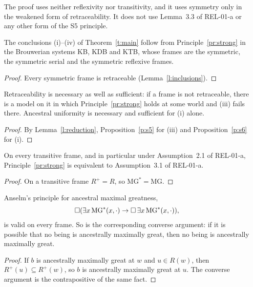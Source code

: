 \documentclass{situationist-preprint}
\newcommand{\MG}{\mathrm{MG}}
\newcommand{\MGs}{\mathrm{MG}^{*}}
\newcommand{\Rp}{R^{+}}
\begin{document}
The proof uses neither reflexivity nor transitivity, and it uses symmetry only in the weakened form of retraceability. It does not use Lemma~3.3 of REL-01-a or any other form of the S5 principle.

\begin{corollary}\label{c:systems}
The conclusions (i)--(iv) of Theorem~\ref{t:main} follow from Principle~\ref{pr:strong} in the Brouwerian systems KB, KDB and KTB, whose frames are the symmetric, the symmetric serial and the symmetric reflexive frames.
\end{corollary}

\begin{proof}
Every symmetric frame is retraceable (Lemma~\ref{l:inclusions}).
\end{proof}

\begin{proposition}\label{p:exact}
Retraceability is necessary as well as sufficient: if a frame is not retraceable, there is a model on it in which Principle~\ref{pr:strong} holds at some world and (iii) fails there. Ancestral uniformity is necessary and sufficient for (i) alone.
\end{proposition}

\begin{proof}
By Lemma~\ref{l:reduction}, Proposition~\ref{p:s5} for (iii) and Proposition~\ref{p:s6} for (i).
\end{proof}

\begin{proposition}\label{p:coincide}
On every transitive frame, and in particular under Assumption~2.1 of REL-01-a, Principle~\ref{pr:strong} is equivalent to Assumption~3.1 of REL-01-a.
\end{proposition}

\begin{proof}
On a transitive frame $\Rp = R$, so $\MGs = \MG$.
\end{proof}

\begin{proposition}\label{p:anselm}
Anselm's principle for ancestral maximal greatness,
\[\nec(\exists x\,\MGs(x,\cdot) \to \nec\,\exists x\,\MGs(x,\cdot)),\]
is valid on every frame. So is the corresponding converse argument: if it is possible that no being is ancestrally maximally great, then no being is ancestrally maximally great.
\end{proposition}

\begin{proof}
If $b$ is ancestrally maximally great at $w$ and $u \in R(w)$, then $\Rp(u) \subseteq \Rp(w)$, so $b$ is ancestrally maximally great at $u$. The converse argument is the contrapositive of the same fact.
\end{proof}
\end{document}
